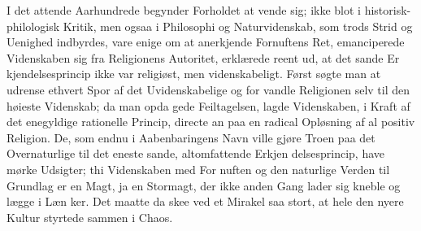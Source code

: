 \documentclass[12pt,a4paper]{article}
\begin{document}
I det attende Aarhundrede begynder Forholdet at vende sig;
ikke blot i historisk-philologisk Kritik, men ogsaa i Philosophi og
Naturvidenskab, som trods Strid og Uenighed indbyrdes, vare enige
om at anerkjende Fornuftens Ret, emanciperede Videnskaben sig
fra Religionens Autoritet, erklærede reent ud, at det sande Er\-%
kjendelsesprincip ikke var religiøst, men videnskabeligt. Først
søgte man at udrense ethvert Spor af det Uvidenskabelige og for\-%
vandle Religionen selv til den høieste Videnskab; da man opda\-%
gede Feiltagelsen, lagde Videnskaben, i Kraft af det enegyldige
rationelle Princip, directe an paa en radical Opløsning af al positiv
Religion. De, som endnu i Aabenbaringens Navn ville gjøre Troen
paa det Overnaturlige til det eneste sande, altomfattende Erkjen\-%
delsesprincip, have mørke Udsigter; thi Videnskaben med For\-%
nuften og den naturlige Verden til Grundlag er en Magt, ja en
Stormagt, der ikke anden Gang lader sig kneble og lægge i Læn\-%
ker. Det maatte da skee ved et Mirakel saa stort, at hele den
nyere Kultur styrtede sammen i Chaos.
\end{document}
